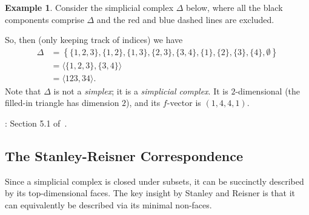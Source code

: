 \documentclass[12pt,a4paper]{article}
\theoremstyle{definition}
\newtheorem{example}[theorem]{Example}
\numberwithin{equation}{section}
\begin{document}
\begin{example}
    Consider the simplicial complex $\Delta$ below, where all the black components comprise $\Delta$ and the red and blue dashed lines are excluded. 
    \begin{center}
    \end{center}
    So, then (only keeping track of indices) we have
    \begin{align*}
        \Delta &= \left\{ \{ 1,2,3 \}, \{ 1,2 \}, \{ 1,3 \}, \{ 2,3 \}, \{ 3,4 \}, \{ 1 \}, \{ 2 \}, \{ 3 \}, \{ 4 \}, \emptyset \right\} \\
        &= \langle \{ 1,2,3 \}, \{ 3,4 \} \rangle \\
        &= \langle 123, 34 \rangle.
    \end{align*}
    Note that $\Delta$ is not a \emph{simplex}; it is a \emph{simplicial complex}.
    It is $2$-dimensional (the filled-in triangle has dimension $2$), and its $f$-vector is $(1, 4, 4, 1)$.
\end{example}

\vspace*{1cm}

: Section 5.1 of~\cite{schenck_computational_2003}.

\vspace*{1cm}


\subsection{The Stanley-Reisner Correspondence}
Since a simplicial complex is closed under subsets, it can be succinctly described by its top-dimensional faces.
The key insight by Stanley and Reisner is that it can equivalently be described via its minimal non-faces.
\end{document}
